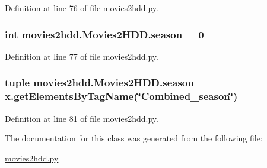 Definition at line 76 of file movies2hdd.\-py.

\hypertarget{classmovies2hdd_1_1_movies2_h_d_d_a948397c62c191d15a109f9867b1a83ec}{
\subsubsection[{season}]{\setlength{\rightskip}{0pt plus 5cm}int movies2hdd.\-Movies2\-H\-D\-D.\-season = 0\hspace{0.3cm}{\ttfamily [static]}}}\label{classmovies2hdd_1_1_movies2_h_d_d_a948397c62c191d15a109f9867b1a83ec}


Definition at line 77 of file movies2hdd.\-py.

\hypertarget{classmovies2hdd_1_1_movies2_h_d_d_a60b03ffa3e3f0b0afbaea6b3a3351dc1}{
\subsubsection[{season}]{\setlength{\rightskip}{0pt plus 5cm}tuple movies2hdd.\-Movies2\-H\-D\-D.\-season = x.\-get\-Elements\-By\-Tag\-Name(\char`\"{}Combined\-\_\-season\char`\"{})\hspace{0.3cm}{\ttfamily [static]}}}\label{classmovies2hdd_1_1_movies2_h_d_d_a60b03ffa3e3f0b0afbaea6b3a3351dc1}


Definition at line 81 of file movies2hdd.\-py.



The documentation for this class was generated from the following file\-:\begin{DoxyCompactItemize}
\item 
\hyperlink{movies2hdd_8py}{movies2hdd.\-py}\end{DoxyCompactItemize}

